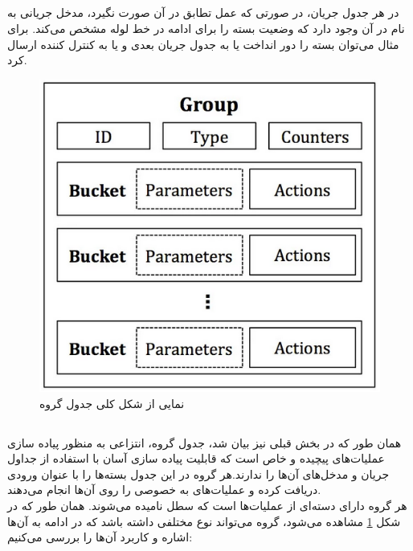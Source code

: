 \subsection{}
در هر جدول جریان، در صورتی که عمل تطابق در آن صورت نگیرد، مدخل جریانی به نام  در آن وجود دارد که وضعیت بسته را برای ادامه در خط لوله مشخص می‌کند. برای مثال می‌توان بسته را دور انداخت یا به جدول جریان بعدی و یا به کنترل کننده ارسال کرد.\\

\begin{figure}
	\centering
	\includegraphics[scale=0.5]{imgs/group_fig.png}
	\caption{نمایی از شکل کلی جدول گروه \cite{spec}}
	\label{fig6}
\end{figure}

\subsection{}
همان طور که در بخش قبلی نیز بیان شد، جدول گروه، انتزاعی به منظور پیاده سازی عملیات‌های پیچیده و خاص است که قابلیت پیاده سازی آسان با استفاده از جداول جریان و مدخل‌های آن‌ها را ندارند.هر گروه در این جدول بسته‌ها را با عنوان ورودی دریافت کرده و عملیات‌های به خصوصی را روی آن‌ها انجام می‌دهند.\\
هر گروه دارای دسته‌ای از عملیات‌ها است که سطل نامیده می‌شوند. همان طور که در شکل \ref{fig6} مشاهده می‌شود، گروه می‌تواند نوع مختلفی داشته باشد که در ادامه به آن‌ها اشاره و کاربرد آن‌ها را بررسی می‌کنیم:

